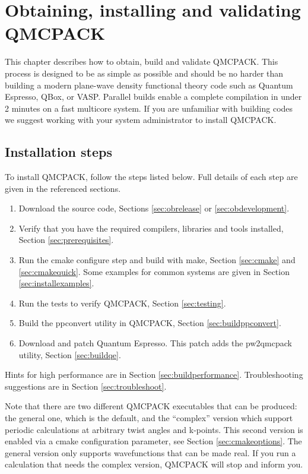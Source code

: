 \chapter{Obtaining, installing and validating QMCPACK}
\label{chap:obtaininginstalling}

This chapter describes how to obtain, build and validate QMCPACK. This process is designed to be as simple as
possible and should be no harder than building a modern plane-wave density
functional theory code such as Quantum Espresso, QBox, or
VASP. Parallel builds enable a complete
compilation in under 2 minutes on a fast multicore system. If you
are unfamiliar with building codes we suggest working with your system
administrator to install QMCPACK.

\section{Installation steps}
To install QMCPACK, follow the steps listed below. Full details of
each step are given in the referenced sections.
\begin{enumerate}
\item Download the source code, Sections \ref{sec:obrelease} or \ref{sec:obdevelopment}.
\item Verify that you have the required compilers, libraries and tools
  installed, Section \ref{sec:prerequisites}.
\item Run the cmake configure step and build with make, Section
  \ref{sec:cmake} and \ref{sec:cmakequick}. Some examples for common
  systems are given in Section \ref{sec:installexamples}.
\item Run the tests to verify QMCPACK, Section \ref{sec:testing}.
\item Build the ppconvert utility in QMCPACK, Section \ref{sec:buildppconvert}.
\item Download and patch Quantum Espresso. This patch adds the
  pw2qmcpack utility, Section \ref{sec:buildqe}.
\end{enumerate}

Hints for high performance are in Section \ref{sec:buildperformance}. Troubleshooting suggestions are in Section \ref{sec:troubleshoot}.

Note that there are two different QMCPACK executables that can be
produced: the general one, which is the default, and the ``complex''
version which support periodic calculations at arbitrary twist angles and
k-points. This second version is enabled via a cmake configuration
parameter, see Section \ref{sec:cmakeoptions}. The general version
only supports wavefunctions that can be made real. If you run a
calculation that needs the complex version, QMCPACK will stop and inform you.

